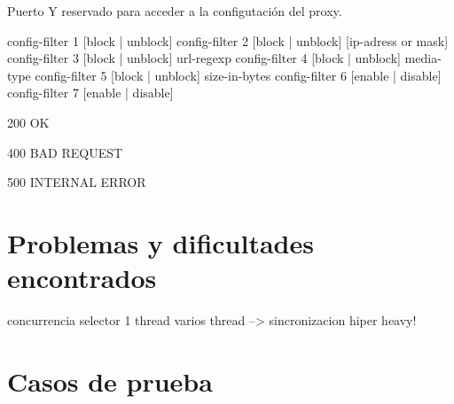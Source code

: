 \documentclass[a4paper,10pt]{article}
\begin{document}
Puerto Y reservado para acceder a la configutaci\'on del proxy.

config-filter 1 [block | unblock]
config-filter 2 [block | unblock] [ip-adress or mask]
config-filter 3 [block | unblock] url-regexp
config-filter 4 [block | unblock] media-type
config-filter 5 [block | unblock] size-in-bytes
config-filter 6 [enable | disable]
config-filter 7 [enable | disable]


200 OK

400 BAD REQUEST

500 INTERNAL ERROR

\newpage
\section{Problemas y dificultades encontrados}

concurrencia
selector 1 thread  varios thread --> sincronizacion hiper heavy!

\newpage
\section{Casos de prueba}
\end{document}
